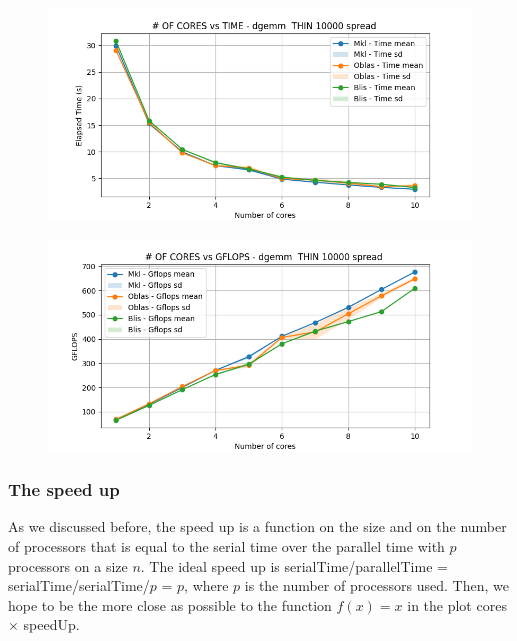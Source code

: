 \documentclass{article}
\begin{document}
\begin{figure}[H]
    \centering
    \includegraphics[width=\textwidth]{THIN scalability deep/dgemm__THIN_10000_spread_time.png}
\end{figure}

\begin{figure}[H]
    \centering
    \includegraphics[width=\textwidth]{THIN scalability deep/dgemm__THIN_10000_spread_gflops.png}
\end{figure}

\subsubsection{The speed up}
As we discussed before, the speed up is a function on the size and on the number of processors that is equal to the serial time over the parallel time with $p$ processors on a size $n$.
The ideal speed up is serialTime/parallelTime = serialTime/serialTime/$p$ = $p$, where $p$ is the number of processors used. Then, we hope to be the more close as possible to the function $f(x) = x $ in the plot cores $\times$ speedUp.
\end{document}
